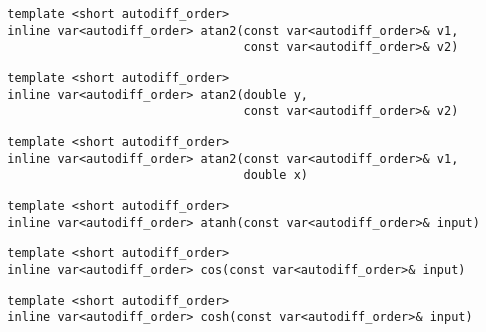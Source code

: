 \begin{tcolorbox}[colback=white,colframe=gray90, coltitle=black,boxrule=3pt,
fonttitle=\bfseries,title=Arc Tangent (Two Arguments)]

\begin{verbatim}
  template <short autodiff_order>
  inline var<autodiff_order> atan2(const var<autodiff_order>& v1,
                                   const var<autodiff_order>& v2)
\end{verbatim}

\begin{verbatim}
  template <short autodiff_order>
  inline var<autodiff_order> atan2(double y,
                                   const var<autodiff_order>& v2)
\end{verbatim}

\begin{verbatim}
  template <short autodiff_order>
  inline var<autodiff_order> atan2(const var<autodiff_order>& v1,
                                   double x)
\end{verbatim}

\end{tcolorbox}

\begin{tcolorbox}[colback=white,colframe=gray90, coltitle=black,boxrule=3pt,
fonttitle=\bfseries,title=Arc Hyperbolic Tangent]

\begin{verbatim}
  template <short autodiff_order>
  inline var<autodiff_order> atanh(const var<autodiff_order>& input)
\end{verbatim}

\end{tcolorbox}

\begin{tcolorbox}[colback=white,colframe=gray90, coltitle=black,boxrule=3pt,
fonttitle=\bfseries,title=Cosine]

\begin{verbatim}
  template <short autodiff_order>
  inline var<autodiff_order> cos(const var<autodiff_order>& input)
\end{verbatim}

\end{tcolorbox}

\begin{tcolorbox}[colback=white,colframe=gray90, coltitle=black,boxrule=3pt,
fonttitle=\bfseries,title=Hyperbolic Cosine]

\begin{verbatim}
  template <short autodiff_order>
  inline var<autodiff_order> cosh(const var<autodiff_order>& input)
\end{verbatim}

\end{tcolorbox}

